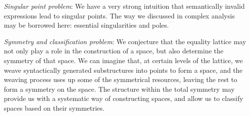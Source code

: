 \emph{Singular point problem}: We have a very strong intuition that semantically invalid expressions lead to singular points.
The way we discussed in complex analysis may be borrowed here: essential singularities and poles.

\emph{Symmetry and classification problem}: We conjecture that the equality lattice may not only play a role in the construction of a space, but also determine the symmetry of that space.
We can imagine that, at certain levels of the lattice, we weave syntactically generated substructures into points to form a space,
and the weaving process uses up some of the symmetrical resources, leaving the rest to form a symmetry on the space.
The structure within the total symmetry may provide us with a systematic way of constructing spaces, and allow us to classify spaces based on their symmetries.
